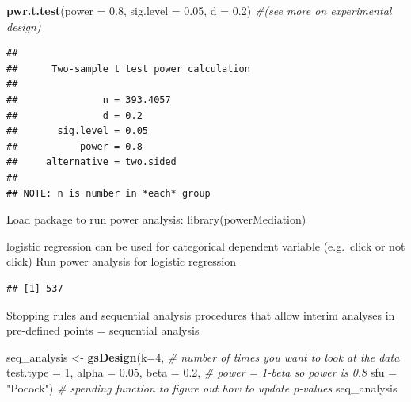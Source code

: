 \documentclass[]{book}
\newenvironment{Shaded}{\begin{snugshade}}{\end{snugshade}}
\newcommand{\CommentTok}[1]{\textcolor[rgb]{0.56,0.35,0.01}{\textit{#1}}}
\newcommand{\DataTypeTok}[1]{\textcolor[rgb]{0.13,0.29,0.53}{#1}}
\newcommand{\DecValTok}[1]{\textcolor[rgb]{0.00,0.00,0.81}{#1}}
\newcommand{\FloatTok}[1]{\textcolor[rgb]{0.00,0.00,0.81}{#1}}
\newcommand{\KeywordTok}[1]{\textcolor[rgb]{0.13,0.29,0.53}{\textbf{#1}}}
\newcommand{\NormalTok}[1]{#1}
\newcommand{\StringTok}[1]{\textcolor[rgb]{0.31,0.60,0.02}{#1}}
\begin{document}
\begin{Shaded}
\begin{Highlighting}[]
\KeywordTok{pwr.t.test}\NormalTok{(}\DataTypeTok{power =} \FloatTok{0.8}\NormalTok{,}
           \DataTypeTok{sig.level =} \FloatTok{0.05}\NormalTok{,}
           \DataTypeTok{d =} \FloatTok{0.2}\NormalTok{) }\CommentTok{#(see more on experimental design)}
\end{Highlighting}
\end{Shaded}

\begin{verbatim}
## 
##      Two-sample t test power calculation 
## 
##               n = 393.4057
##               d = 0.2
##       sig.level = 0.05
##           power = 0.8
##     alternative = two.sided
## 
## NOTE: n is number in *each* group
\end{verbatim}

Load package to run power analysis: library(powerMediation)

logistic regression can be used for categorical dependent variable (e.g.~click or not click)
Run power analysis for logistic regression

\begin{Shaded}
\end{Shaded}

\begin{verbatim}
## [1] 537
\end{verbatim}

Stopping rules and sequential analysis
procedures that allow interim analyses in pre-defined points = sequential analysis

\begin{Shaded}
\begin{Highlighting}[]
\NormalTok{seq_analysis <-}\StringTok{ }\KeywordTok{gsDesign}\NormalTok{(}\DataTypeTok{k=}\DecValTok{4}\NormalTok{, }\CommentTok{# number of times you want to look at the data}
                         \DataTypeTok{test.type =} \DecValTok{1}\NormalTok{,}
                         \DataTypeTok{alpha =} \FloatTok{0.05}\NormalTok{,}
                         \DataTypeTok{beta =} \FloatTok{0.2}\NormalTok{, }\CommentTok{# power = 1-beta so power is 0.8}
                         \DataTypeTok{sfu =} \StringTok{"Pocock"}\NormalTok{) }\CommentTok{# spending function to figure out how to update p-values}
\NormalTok{seq_analysis}
\end{Highlighting}
\end{Shaded}
\end{document}
